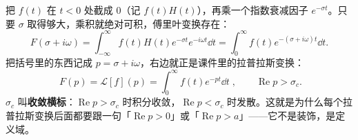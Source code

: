 \documentclass[11pt]{ctexart}
\begin{document}

把 $f(t)$ 在 $t<0$ 处截成 $0$（记 $f(t)H(t)$），再乘一个指数衰减因子 $e^{-\sigma t}$。只要 $\sigma$ 取得够大，乘积就绝对可积，傅里叶变换存在：
\[
F(\sigma+i\omega)=\int_{-\infty}^{\infty}f(t)H(t)e^{-\sigma t}e^{-i\omega t}\dd t
=\int_0^{\infty}f(t)e^{-(\sigma+i\omega)t}\dd t .
\]
把括号里的东西记成 $p=\sigma+i\omega$，右边就正是课件里的拉普拉斯变换：
\[
\boxed{\;F(p)=\mathcal L[f](p)=\int_0^{\infty}f(t)e^{-pt}\dd t\;},\qquad \operatorname{Re}p>\sigma_c .
\]
$\sigma_c$ 叫\textbf{收敛横标}：$\operatorname{Re}p>\sigma_c$ 时积分收敛，$\operatorname{Re}p<\sigma_c$ 时发散。这就是为什么每个拉普拉斯变换后面都要跟一句「$\operatorname{Re}p>0$」或「$\operatorname{Re}p>a$」——它不是装饰，是定义域。


\end{document}
